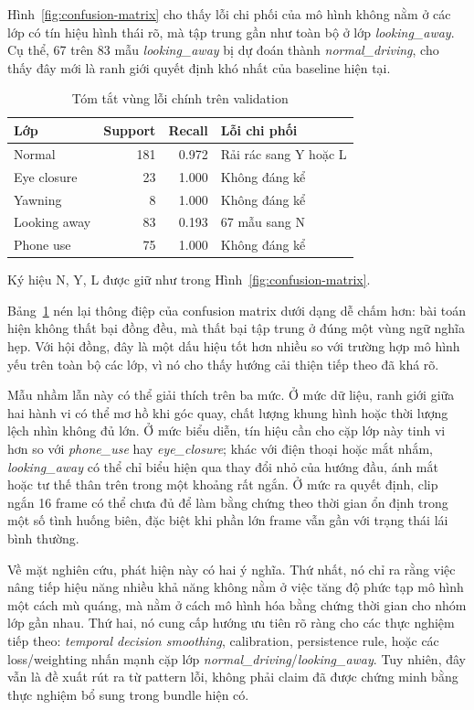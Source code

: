 \documentclass[conference,a4paper]{IEEEtran}
\begin{document}
Hình~\ref{fig:confusion-matrix} cho thấy lỗi chi phối của mô hình không nằm ở các lớp có tín hiệu hình thái rõ, mà tập trung gần như toàn bộ ở lớp \textit{looking\_away}. Cụ thể, 67 trên 83 mẫu \textit{looking\_away} bị dự đoán thành \textit{normal\_driving}, cho thấy đây mới là ranh giới quyết định khó nhất của baseline hiện tại.

\begin{table}[t]
\caption{Tóm tắt vùng lỗi chính trên validation}
\label{tab:error-summary}
\centering
\scriptsize
\begin{tabular}{p{1.45cm}rrp{2.15cm}}
\toprule
Lớp & Support & Recall & Lỗi chi phối \\
\midrule
Normal & 181 & 0.972 & Rải rác sang Y hoặc L \\
Eye closure & 23 & 1.000 & Không đáng kể \\
Yawning & 8 & 1.000 & Không đáng kể \\
Looking away & 83 & 0.193 & 67 mẫu sang N \\
Phone use & 75 & 1.000 & Không đáng kể \\
\bottomrule
\end{tabular}

\vspace{0.15em}
{\scriptsize Ký hiệu N, Y, L được giữ như trong Hình~\ref{fig:confusion-matrix}.}
\end{table}

Bảng~\ref{tab:error-summary} nén lại thông điệp của confusion matrix dưới dạng dễ chấm hơn: bài toán hiện không thất bại đồng đều, mà thất bại tập trung ở đúng một vùng ngữ nghĩa hẹp. Với hội đồng, đây là một dấu hiệu tốt hơn nhiều so với trường hợp mô hình yếu trên toàn bộ các lớp, vì nó cho thấy hướng cải thiện tiếp theo đã khá rõ.

Mẫu nhầm lẫn này có thể giải thích trên ba mức. Ở mức dữ liệu, ranh giới giữa hai hành vi có thể mơ hồ khi góc quay, chất lượng khung hình hoặc thời lượng lệch nhìn không đủ lớn. Ở mức biểu diễn, tín hiệu cần cho cặp lớp này tinh vi hơn so với \textit{phone\_use} hay \textit{eye\_closure}; khác với điện thoại hoặc mắt nhắm, \textit{looking\_away} có thể chỉ biểu hiện qua thay đổi nhỏ của hướng đầu, ánh mắt hoặc tư thế thân trên trong một khoảng rất ngắn. Ở mức ra quyết định, clip ngắn 16 frame có thể chưa đủ để làm bằng chứng theo thời gian ổn định trong một số tình huống biên, đặc biệt khi phần lớn frame vẫn gần với trạng thái lái bình thường.

Về mặt nghiên cứu, phát hiện này có hai ý nghĩa. Thứ nhất, nó chỉ ra rằng việc nâng tiếp hiệu năng nhiều khả năng không nằm ở việc tăng độ phức tạp mô hình một cách mù quáng, mà nằm ở cách mô hình hóa bằng chứng thời gian cho nhóm lớp gần nhau. Thứ hai, nó cung cấp hướng ưu tiên rõ ràng cho các thực nghiệm tiếp theo: \textit{temporal decision smoothing}, calibration, persistence rule, hoặc các loss/weighting nhấn mạnh cặp lớp \textit{normal\_driving}/\textit{looking\_away}. Tuy nhiên, đây vẫn là đề xuất rút ra từ pattern lỗi, không phải claim đã được chứng minh bằng thực nghiệm bổ sung trong bundle hiện có.
\end{document}
